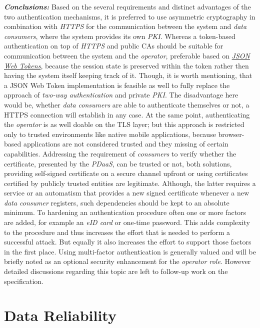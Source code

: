 \documentclass[12pt,english,a4paper,titlepage,cleardoublepage=empty,dottedtoc]{report}
\begin{document}
\emph{\textbf{Conclusions:}} Based on the several requirements and
distinct advantages of the two authentication mechanisms, it is
preferred to use asymmetric cryptography in combination with
\emph{HTTPS} for the communication between the system and \emph{data
consumers}, where the system provides its own \emph{PKI}. Whereas a
token-based authentication on top of \emph{HTTPS} and public CAs should
be suitable for communication between the system and the
\emph{operator}, preferable based on
\emph{\protect\hyperlink{def--jwt}{JSON Web Tokens}}, because the
session state is preserved within the token rather then having the
system itself keeping track of it. Though, it is worth mentioning, that
a JSON Web Token implementation is feasible as well to fully replace the
approach of \emph{two-way authentication} and private \emph{PKI}. The
disadvantage here would be, whether \emph{data consumers} are able to
authenticate themselves or not, a HTTPS connection will establish in any
case. At the same point, authenticating the \emph{operator} is as well
doable on the TLS layer; but this approach is restricted only to trusted
environments like native mobile applications, because browser-based
applications are not considered trusted and they missing of certain
capabilities. Addressing the requirement of \emph{consumers} to verify
whether the certificate, presented by the \emph{PDaaS}, can be trusted
or not, both solutions, providing self-signed certificate on a secure
channel upfront or using certificates certified by publicly trusted
entities are legitimate. Although, the latter requires a service or an
automatism that provides a new signed certificate whenever a new
\emph{data consumer} registers, such dependencies should be kept to an
absolute minimum. To hardening an authentication procedure often one or
more factors are added, for example an \emph{eID card} or one-time
password. This adds complexity to the procedure and thus increases the
effort that is needed to perform a successful attack. But equally it
also increases the effort to support those factors in the first place.
Using multi-factor authentication is generally valued and will be
briefly noted as an optional security enhancement for the \emph{operator
role}. However detailed discussions regarding this topic are left to
follow-up work on the specification.

\hypertarget{data-reliability}{\section{Data
Reliability}\label{data-reliability}}
\end{document}
